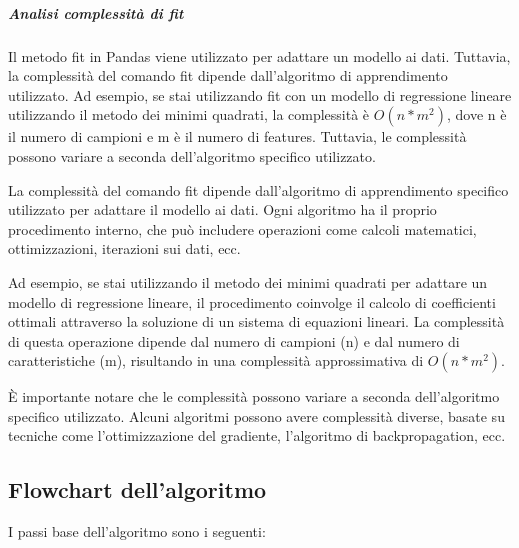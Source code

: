 \subparagraph{Analisi complessità di \textit{fit}}
Il metodo fit in Pandas viene utilizzato per adattare un modello ai dati. 
Tuttavia, la complessità del comando fit dipende dall'algoritmo di apprendimento utilizzato. 
Ad esempio, se stai utilizzando fit con un modello di regressione lineare utilizzando il metodo dei minimi quadrati, 
la complessità è $O(n * m^2)$, dove n è il numero di campioni e m è il numero di features. 
Tuttavia, le complessità possono variare a seconda dell'algoritmo specifico utilizzato.

La complessità del comando fit dipende dall'algoritmo di apprendimento specifico utilizzato
 per adattare il modello ai dati. Ogni algoritmo ha il proprio procedimento interno, 
 che può includere operazioni come calcoli matematici, ottimizzazioni, iterazioni sui dati, ecc.

Ad esempio, se stai utilizzando il metodo dei minimi quadrati per adattare un modello di 
regressione lineare, il procedimento coinvolge il calcolo di coefficienti ottimali attraverso 
la soluzione di un sistema di equazioni lineari. 
La complessità di questa operazione dipende dal numero di campioni (n) e dal numero di 
caratteristiche (m), risultando in una complessità approssimativa di $O(n * m^2)$.

È importante notare che le complessità possono variare a seconda dell'algoritmo specifico utilizzato. Alcuni algoritmi possono avere complessità diverse, basate su tecniche come l'ottimizzazione del gradiente, l'algoritmo di backpropagation, ecc.

\newpage
\subsection{Flowchart dell'algoritmo}
I passi base dell'algoritmo sono i seguenti: 

